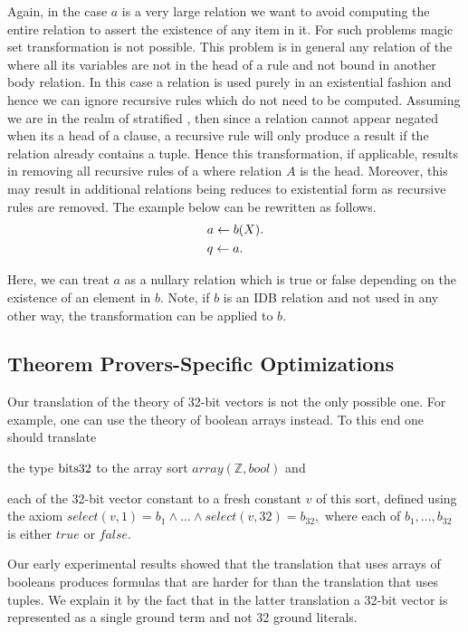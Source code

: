 Again, in the case $a$ is a very large relation we want to avoid computing the entire 
relation to assert the existence of any item in it. For such problems magic set transformation 
is not possible. This problem is in general any relation of the where all its variables are not 
in the head of a rule and not bound in another body relation. In this 
case a relation is used purely in an existential fashion and hence we can ignore recursive rules which 
do not need to be computed. Assuming we are in the realm of stratified \Datalog, then since a relation 
cannot appear negated when its a head of a clause, a recursive rule will only produce a result if the relation 
already contains a tuple. Hence this transformation, if applicable, results in removing all recursive 
rules of a where relation $A$ is the head. Moreover, this may result in additional relations being 
reduces to existential form as recursive rules are removed. The example below can be rewritten as 
follows.
\begin{align*}
&a \mathrel{\leftarrow} b(X).\\
&q \mathrel{\leftarrow} a.
\end{align*}

Here, we can treat $a$ as a nullary relation which is true or false depending 
on the existence of an element in $b$. Note, if $b$ is an IDB relation and not 
used in any other way, the transformation can be applied to $b$.

\subsection{Theorem Provers-Specific Optimizations}
Our translation of the theory of 32-bit vectors is not the only possible one. For example, one can use the theory of boolean arrays instead. To this end one should translate
\begin{enumerate*}[label=(\roman*)]
  \item the type $\mathrm{bits32}$ to the array sort $\mathit{array}(\mathbb{Z},\mathit{bool})$ and
  \item each of the 32-bit vector constant to a fresh constant $v$ of this sort, defined using the axiom $\mathit{select}(v,1)=b_1\wedge\ldots\wedge\mathit{select}(v, 32)=b_{32},$ where each of $b_1,\ldots,b_{32}$ is either $\mathit{true}$ or $\mathit{false}$.
\end{enumerate*}
Our early experimental results showed that the translation that uses arrays of booleans produces formulas that are harder for \vampire than the translation that uses tuples. We explain it by the fact that in the latter translation a 32-bit vector is represented as a single ground term and not 32 ground literals.

